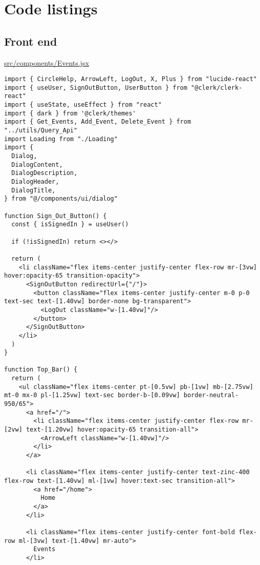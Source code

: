 \appendix

\chapter{Code listings}

\section{Front end}

\underline{src/components/Events.jsx}

\begin{verbatim}
import { CircleHelp, ArrowLeft, LogOut, X, Plus } from "lucide-react"
import { useUser, SignOutButton, UserButton } from "@clerk/clerk-react"
import { useState, useEffect } from "react"
import { dark } from '@clerk/themes'
import { Get_Events, Add_Event, Delete_Event } from "../utils/Query_Api"
import Loading from "./Loading"
import {
  Dialog,
  DialogContent,
  DialogDescription,
  DialogHeader,
  DialogTitle,
} from "@/components/ui/dialog"

function Sign_Out_Button() {
  const { isSignedIn } = useUser()

  if (!isSignedIn) return <></>

  return (
    <li className="flex items-center justify-center flex-row mr-[3vw] hover:opacity-65 transition-opacity">
      <SignOutButton redirectUrl={"/"}>
        <button className="flex items-center justify-center m-0 p-0 text-sec text-[1.40vw] border-none bg-transparent">
          <LogOut className="w-[1.40vw]"/>
        </button>
      </SignOutButton>
    </li>
  )
}

function Top_Bar() {
  return (
    <ul className="flex items-center pt-[0.5vw] pb-[1vw] mb-[2.75vw] mt-0 mx-0 pl-[1.25vw] text-sec border-b-[0.09vw] border-neutral-950/65">
      <a href="/">
        <li className="flex items-center justify-center flex-row mr-[2vw] text-[1.20vw] hover:opacity-65 transition-all">
          <ArrowLeft className="w-[1.40vw]"/>
        </li>
      </a>

      <li className="flex items-center justify-center text-zinc-400 flex-row text-[1.40vw] ml-[1vw] hover:text-sec transition-all">
        <a href="/home">
          Home
        </a>
      </li>

      <li className="flex items-center justify-center font-bold flex-row ml-[3vw] text-[1.40vw] mr-auto">
        Events
      </li>


\end{verbatim}
